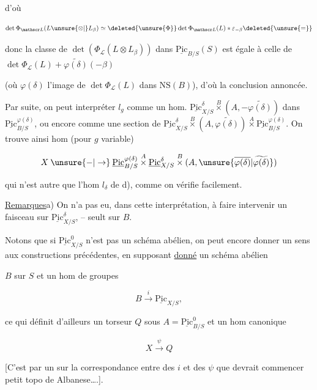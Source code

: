d'où

\[
\det\Phi_{\mathscr L}(L\unsure{\otimes|{}}L_\beta)\simeq\deleted{\unsure{\Phi}}\det\Phi_{\mathscr L}(L)*\varepsilon_{-\beta}\deleted{\unsure{=}}
\]

donc la classe de $\det(\Phi_{\mathscr L}(L\otimes L_\beta))$ dans $\underline{\mathrm{Pic}}_{B/S}(S)$ est égale à \deleted{$\det($} celle de $\det\Phi_{\mathscr L}(L)+\widetilde{\varphi(\delta)}(-\beta)$

(où $\varphi(\delta)$  l'image de $\det\Phi_{\mathscr L}(L)$ dans $\mathrm{NS}(B)$), d'où la conclusion annoncée.

Par suite, on peut interpréter $l_g$ comme un hom. $\underline{\mathrm{Pic}}^\delta_{X/S}\overset{B}{\times}(A,-\widetilde{\varphi(\delta)})$ dans $\underline{\mathrm{Pic}}^{\varphi(\delta)}_{B/S}$, ou encore comme une  section de $\underline{\mathrm{Pic}}^\delta_{X/S}\overset{B}{\times}(A,\widetilde{\varphi(\delta)})\overset{A}{\times}\underline{\mathrm{Pic}}^{\varphi(\delta)}_{B/S}$. On trouve ainsi  hom (pour $g$ variable)

\[
X\mathbin{\unsure{-|\to}}\underline{\mathrm{Pic}}^{\varphi(\delta)}_{B/S}\overset{A}{\times}\underline{\mathrm{Pic}}^\delta_{X/S}\overset{B}{\times}(A,\unsure{\overline{\varphi(\delta)}|\widetilde{\varphi(\delta)}})
\]

qui n'est autre que  l'hom $l_\delta$ de d), comme on vérifie facilement.

\uline{Remarques}\qquad a) On n'a pas eu, dans cette interprétation, à faire intervenir un faisceau sur $\underline{\mathrm{Pic}}^\delta_{X/S}$, -- seult sur $B$.

Notons que si $\underline{\mathrm{Pic}}^0_{X/S}$ n'est pas un schéma abélien, on peut encore donner un sens aux constructions précédentes, en supposant \uline{donné} un schéma abélien

$B$ sur $S$ et un hom de groupes

\[
B\xrightarrow{i}\underline{\mathrm{Pic}}_{X/S},
\]

ce qui définit d'ailleurs un torseur $Q$ sous $A=\underline{\mathrm{Pic}}^0_{B/S}$ et un hom canonique

\[
X\xrightarrow{\psi} Q
\]

[C'est par un  sur la correspondance entre des $i$ et des $\psi$ que devrait commencer   petit topo de Albanese\ldots.].

